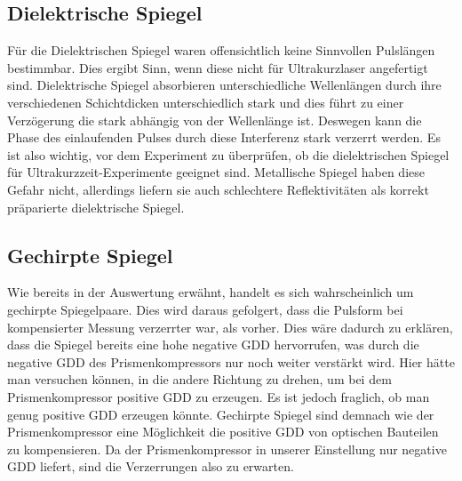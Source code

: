 \documentclass[twoside,        %
               BCOR12mm,       %
               english,ngerman, %
               fleqn,headsepline=false,footsepline=false
              ]{Vorlage/MFPREPORT}
\begin{document}
\subsection{Dielektrische Spiegel}
Für die Dielektrischen Spiegel waren offensichtlich keine Sinnvollen Pulslängen
bestimmbar. Dies ergibt Sinn, wenn diese nicht für Ultrakurzlaser angefertigt
sind. Dielektrische Spiegel absorbieren unterschiedliche Wellenlängen durch
ihre verschiedenen Schichtdicken unterschiedlich stark und dies führt zu einer
Verzögerung die stark abhängig von der Wellenlänge ist. Deswegen kann die Phase
des einlaufenden Pulses durch diese Interferenz stark verzerrt werden. 
Es ist also wichtig, vor dem Experiment zu überprüfen, ob die dielektrischen
Spiegel für Ultrakurzzeit-Experimente geeignet sind. Metallische Spiegel haben
diese Gefahr nicht, allerdings liefern sie auch schlechtere Reflektivitäten als
korrekt präparierte dielektrische Spiegel.
\subsection{Gechirpte Spiegel}
Wie bereits in der Auswertung erwähnt, handelt es sich wahrscheinlich um
gechirpte Spiegelpaare. Dies wird daraus gefolgert, dass die Pulsform bei
kompensierter Messung verzerrter war, als vorher. Dies wäre dadurch zu
erklären, dass die Spiegel bereits eine hohe negative GDD hervorrufen, was
durch die negative GDD des Prismenkompressors nur noch weiter verstärkt wird.
Hier hätte man versuchen können, in die andere Richtung zu drehen, um bei dem
Prismenkompressor positive GDD zu erzeugen. Es ist jedoch fraglich, ob man
genug positive GDD erzeugen könnte. 
Gechirpte Spiegel sind demnach wie der Prismenkompressor eine Möglichkeit die
positive GDD von optischen Bauteilen zu kompensieren. Da der Prismenkompressor
in unserer Einstellung nur negative GDD liefert, sind die Verzerrungen also zu
erwarten.
\end{document}
